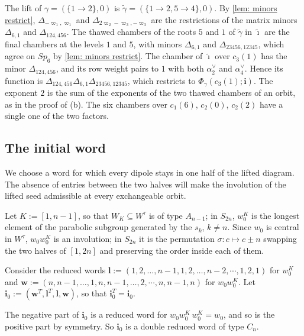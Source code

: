 \documentclass[a4paper]{amsart}
\numberwithin{equation}{section}
\theoremstyle{definition}
\theoremstyle{remark}
\newcommand{\bfi}{\mathbf{i}}
\newcommand{\tbfi}{\widetilde{\boldsymbol{\imath}}}
\newcommand{\tg}{\widetilde{\gamma}}
\begin{document}
\begin{example}
  The lift of $\gamma=(\{1\to2\},0)$ is $\tg=(\{1\to2,5\to4\},0)$.
  By \cref{lem: minors restrict}, $\Delta_{-\varpi_1,\varpi_1}$ and $\Delta_{2\varpi_2-\varpi_3,-\varpi_3}$ are the restrictions of the matrix minors $\Delta_{6,1}$ and $\Delta_{124,456}$.
  The thawed chambers of the roots $5$ and $1$ of $\tg$ in $\tbfi$ are the final chambers at the levels $1$ and $5$, with minors $\Delta_{6,1}$ and $\Delta_{23456,12345}$, which agree on $Sp_6$ by \cref{lem: minors restrict}.
  The chamber of $\tbfi$ over $c_3(1)$ has the minor $\Delta_{124,456}$, and its row weight pairs to $1$ with both $\alpha_2^\vee$ and $\alpha_4^\vee$.
  Hence its function is $\Delta_{124,456}\Delta_{6,1}\Delta_{23456,12345}$, which restricts to $\Phi_\gamma(c_3(1);\bfi)$.
  The exponent $2$ is the sum of the exponents of the two thawed chambers of an orbit, as in the proof of (b).
  The six chambers over $c_1(6)$, $c_2(0)$, $c_2(2)$ have a single one of the two factors.
\end{example}

\subsection{The initial word}
We choose a word for which every dipole stays in one half of the lifted diagram.
The absence of entries between the two halves will make the involution of the lifted seed admissible at every exchangeable orbit.

Let $K:=[1,n-1]$, so that $W_K\subseteq W^\tau$ is of type $A_{n-1}$; in $S_{2n}$, $w_0^K$ is the longest element of the parabolic subgroup generated by the $s_k$, $k\neq n$.
Since $w_0$ is central in $W^\tau$, $w_0w_0^K$ is an involution; in $S_{2n}$ it is the permutation $\sigma:c\mapsto c\pm n$ swapping the two halves of $[1,2n]$ and preserving the order inside each of them.

\begin{definition}
  \label{def: initial word}
  Consider the reduced words $\mathbf l:=(1,2,\dots,n-1,1,2,\dots,n-2,\cdots,1,2,1)$ for $w_0^K$ and $\mathbf w:=(n,n-1,\dots,1,n,n-1,\dots,2,\cdots,n,n-1,n)$ for $w_0w_0^K$.
  Let $\bfi_0:=(\mathbf w^T,\mathbf l^T,\mathbf l,\mathbf w)$, so that $\bfi_0^T=\bfi_0$.
\end{definition}

The negative part of $\bfi_0$ is a reduced word for $w_0w_0^K\,w_0^K=w_0$, and so is the positive part by symmetry.
So $\bfi_0$ is a double reduced word of type $C_n$.
\end{document}
